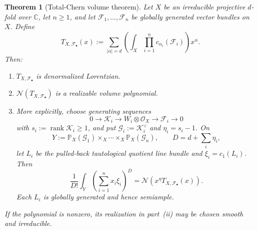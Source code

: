 \documentclass[11pt,a4paper,oneside]{amsart}
\numberwithin{equation}{section}
\newtheorem{theorem}{Theorem}[section]
\theoremstyle{definition}
\theoremstyle{remark}
\DeclareMathOperator{\rank}{rank}
\newcommand{\C}{\mathbb C}
\newcommand{\cN}{\mathcal N}
\newcommand{\cO}{\mathcal O}
\newcommand{\cF}{\mathcal F}
\newcommand{\cG}{\mathcal G}
\newcommand{\cK}{\mathcal K}
\begin{document}
\begin{theorem}[Total-Chern volume theorem]\label{thm:total-chern-volume}
Let $X$ be an irreducible projective $d$-fold over $\C$, let $n\geq1$, and let $\cF_1,\ldots,\cF_n$ be globally generated vector bundles on $X$.  Define
\begin{equation}\label{eq:total-chern-polynomial}
 T_{X,\cF_\bullet}(x)
 :=\sum_{|\alpha|=d}
 \left(\int_X\prod_{i=1}^n c_{\alpha_i}(\cF_i)\right)x^\alpha.
\end{equation}
Then:
\begin{enumerate}[label=\textup{(\roman*)}]
\item $T_{X,\cF_\bullet}$ is denormalized Lorentzian.
\item $\cN(T_{X,\cF_\bullet})$ is a realizable volume polynomial.
\item More explicitly, choose generating sequences
\begin{equation}\label{eq:generating-sequences}
 0\longrightarrow\cK_i\longrightarrow W_i\otimes\cO_X
 \longrightarrow\cF_i\longrightarrow0
\end{equation}
with $s_i:=\rank\cK_i\geq1$, and put $\cG_i:=\cK_i^\vee$ and $\eta_i=s_i-1$.  On
\[
 Y:=\mathbb P_X(\cG_1)\times_X\cdots\times_X\mathbb P_X(\cG_n),
 \qquad
 D=d+\sum_i\eta_i,
\]
let $L_i$ be the pulled-back tautological quotient line bundle and $\xi_i=c_1(L_i)$.  Then
\begin{equation}\label{eq:general-shifted-volume}
 \frac1{D!}\int_Y\left(\sum_{i=1}^nx_i\xi_i\right)^D
 =\cN\!\left(x^\eta T_{X,\cF_\bullet}(x)\right).
\end{equation}
Each $L_i$ is globally generated and hence semiample.
\end{enumerate}
If the polynomial is nonzero, its realization in part~\textup{(ii)} may be chosen smooth and irreducible.
\end{theorem}
\end{document}
